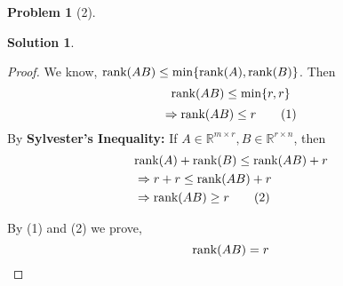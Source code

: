 \documentclass{amsart}[11pt]
\theoremstyle{definition}
\newtheorem*{problem}{Problem}
\newtheorem*{solution}{Solution}
\newcommand{\R}{\mathbb{R}}
\newcommand{\rank}{\textnormal{rank}}
\begin{document}
\begin{problem}[2]
\begin{solution}
\begin{enumerate}[(a)]
\begin{proof}
            \noindent We know, $\rank(AB) \leq \min\{\rank(A), \rank(B)\}$. Then
            \[\rank(AB) \leq \min\{r, r\}\]
            \[\Rightarrow\rank(AB) \leq r\tag{1}\]
            By \textbf{Sylvester's Inequality:} If $A \in \R^{m\times r}, B \in \R^{r\times n}$, then 
            \begin{align*}
                &\rank(A) + \rank(B) \leq \rank(AB) + r \\
                &\Rightarrow r + r \leq \rank(AB) + r \\
                &\Rightarrow \rank(AB) \geq r \tag{2}
            \end{align*}

            By (1) and (2) we prove,
            \[\rank(AB) = r\]
        \end{proof}
    \end{enumerate}
\end{solution}
\end{problem}
\end{document}
